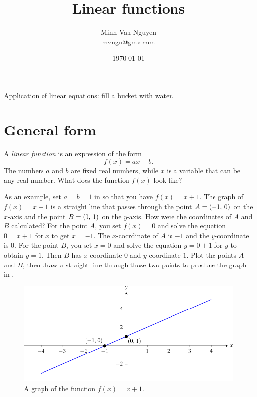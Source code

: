 \documentclass[a4paper,oneside,12pt]{article}
\begin{document}
\title{\Large\bf Linear functions}
\author{%
  Minh Van Nguyen \\
  \url{mvngu@gmx.com}
}
\date{\today}
\maketitle

\begin{packeditem}
\item Application of linear equations: fill a bucket with water.
\end{packeditem}


\section{General form}
\label{sec:general_form}

A \emph{linear function} is an expression of the form
\begin{equation}
\label{eqn:linear_function_general}
f(x)
=
ax + b.
\end{equation}
The numbers $a$ and $b$ are fixed real numbers, while $x$ is a
variable that can be any real number.  What does the function $f(x)$
look like?

As an example, set $a = b = 1$ in
 so that you have
$f(x) = x + 1$.  The graph of $f(x) = x + 1$ is a straight line that
passes through the point $A = \left\lparen{-1},\, {0}\right\rparen$ on the $x$-axis and the
point $B = \left\lparen{0},\, {1}\right\rparen$ on the $y$-axis.  How were the coordinates of
$A$ and $B$ calculated?  For the point $A$, you set $f(x) = 0$ and
solve the equation $0 = x + 1$ for $x$ to get $x = -1$.  The
$x$-coordinate of $A$ is $-1$ and the $y$-coordinate is $0$.  For the
point $B$, you set $x = 0$ and solve the equation $y = 0 + 1$ for $y$
to obtain $y = 1$.  Then $B$ has $x$-coordinate $0$ and $y$-coordinate
$1$.  Plot the points $A$ and $B$, then draw a straight line through
those two points to produce the graph in .

\begin{figure}[!htbp]
\centering
\includegraphics[scale=1]{image/06/a-1-b-1.pdf}
\caption{%
  A graph of the function $f(x) = x + 1$.
}
\label{fig:plot_x_+_1}
\end{figure}
\end{document}
